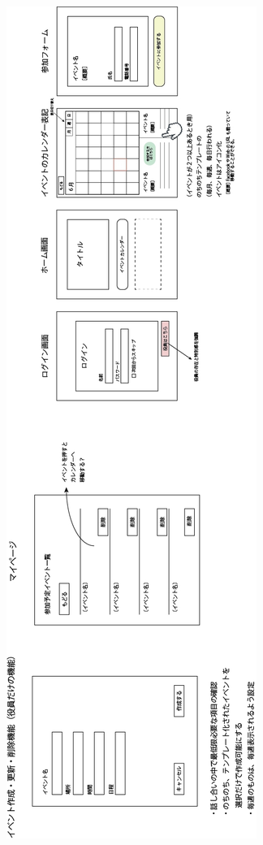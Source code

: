 \begin{figure}[h]
    \begin{center}
    \includegraphics[keepaspectratio, scale=0.38]{appendixs/appendixA-2.jpg}
    \end{center}
\end{figure}
